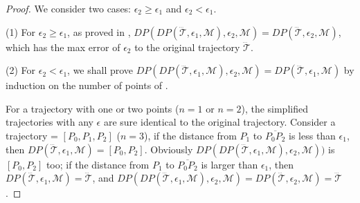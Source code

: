 \begin{proof} We consider two cases: $\epsilon_2 \ge \epsilon_1$ and $\epsilon_2 < \epsilon_1$.

(1) For $\epsilon_2 \ge \epsilon_1$, as proved in \cite{Cao:Spatio}, $DP(DP(\dddot{\mathcal{T}}, \epsilon_1, \mathcal{M}), \epsilon_2, \mathcal{M}) = DP(\dddot{\mathcal{T}}, \epsilon_2, \mathcal{M})$, which has the max error of $\epsilon_2$ to the original trajectory $\dddot{\mathcal{T}}$.
	
(2) For $\epsilon_2 < \epsilon_1$, we shall prove $DP(DP(\dddot{\mathcal{T}}, \epsilon_1, \mathcal{M}), \epsilon_2, \mathcal{M}) = DP(\dddot{\mathcal{T}}, \epsilon_1, \mathcal{M})$ by  induction on the number of points of .
\bi	
	\item  For a trajectory  with one or two points ($n=1$ or $n=2$), the simplified trajectories with any $\epsilon$ are sure identical to the original trajectory.
	Consider a trajectory  =	$[P_0, P_1, P_2]$ ($n = 3$),
	if the distance from $P_1$ to $\overline{P_0P_2}$ is less than $\epsilon_1$, then $DP(\dddot{\mathcal{T}}, \epsilon_1, \mathcal{M}) = [P_0, P_2]$. Obviously $DP(DP(\dddot{\mathcal{T}}, \epsilon_1, \mathcal{M}), \epsilon_2, \mathcal{M}))$ is $[P_0, P_2]$ too;	
	if the distance from $P_1$ to $\overline{P_0P_2}$ is larger than $\epsilon_1$, then $DP(\dddot{\mathcal{T}}, \epsilon_1, \mathcal{M})=\dddot{\mathcal{T}}$, and $DP(DP(\dddot{\mathcal{T}}, \epsilon_1, \mathcal{M}), \epsilon_2, \mathcal{M}) = DP(\dddot{\mathcal{T}}, \epsilon_2, \mathcal{M})=\dddot{\mathcal{T}}$.
	

\end{proof}
